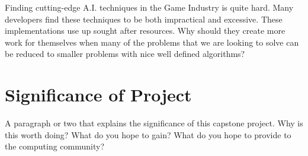 Finding cutting-edge A.I. techniques in the Game Industry is quite hard. Many developers find these techniques to be both impractical and excessive. These implementations use up sought after resources. Why should they create more work for themselves when many of the problems that we are looking to solve can be reduced to smaller problems with nice well defined algorithms?







\section{Significance of Project} 

A paragraph or two that explains the significance of this capstone project. Why is this worth doing? What do you hope to gain? What do you hope to provide to the computing community?

